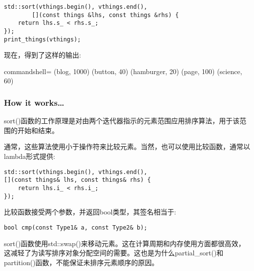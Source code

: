 \begin{itemize}
\begin{lstlisting}[style=styleCXX]
std::sort(vthings.begin(), vthings.end(),
		[](const things &lhs, const things &rhs) {
	return lhs.s_ < rhs.s_;
});
print_things(vthings);
\end{lstlisting}

现在，得到了这样的输出:

\begin{tcblisting}{commandshell={}}
(blog, 1000) (button, 40) (hamburger, 20) (page, 100)
(science, 60)
\end{tcblisting}

\end{itemize}

\subsubsection{How it works…}

sort()函数的工作原理是对由两个迭代器指示的元素范围应用排序算法，用于该范围的开始和结束。

通常，这些算法使用小于操作符来比较元素。当然，也可以使用比较函数，通常以lambda形式提供:

\begin{lstlisting}[style=styleCXX]
std::sort(vthings.begin(), vthings.end(),
[](const things& lhs, const things& rhs) {
	return lhs.i_ < rhs.i_;
});
\end{lstlisting}

比较函数接受两个参数，并返回bool类型，其签名相当于:

\begin{lstlisting}[style=styleCXX]
bool cmp(const Type1& a, const Type2& b);
\end{lstlisting}

sort()函数使用std::swap()来移动元素。这在计算周期和内存使用方面都很高效，这减轻了为读写排序对象分配空间的需要。这也是为什么partial\_sort()和partition()函数，不能保证未排序元素顺序的原因。











